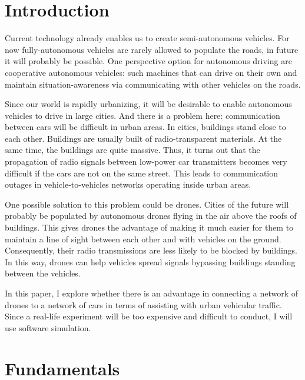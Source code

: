 \documentclass[]{nsm-thesis}
\begin{document}
\chapter{Introduction}
\label{sec:introduction}

Current technology already enables us to create semi-autonomous vehicles. For now fully-autonomous vehicles are rarely allowed to 
populate the roads, in future it will probably be possible. One perspective option for autonomous driving are cooperative autonomous vehicles: such machines
that can drive on their own and maintain situation-awareness via communicating with other vehicles on the roads.

Since our world is rapidly urbanizing, it will be desirable to enable autonomous vehicles to drive in large cities. And there is a problem here: communication between cars will be difficult in urban areas. In cities, buildings stand close to each other. Buildings are usually built of radio-transparent materials. At the same time, the buildings are quite massive. Thus, it turns out that the propagation of radio signals between low-power car transmitters becomes very difficult if the cars are not on the same street. This leads to communication outages in vehicle-to-vehicles networks operating inside urban areas.

One possible solution to this problem could be drones. Cities of the future will probably be populated by autonomous drones flying in the air above the roofs of buildings. This gives drones the advantage of making it much easier for them to maintain a line of sight between each other and with vehicles on the ground. Consequently, their radio transmissions are less likely to be blocked by buildings. In this way, drones can help vehicles spread signals bypassing buildings standing between the vehicles.

In this paper, I explore whether there is an advantage in connecting a network of drones to a network of cars in terms of assisting with urban vehicular traffic.
Since a real-life experiment will be too expensive and difficult to conduct, I will use software simulation.

\chapter{Fundamentals}
\label{sec:fundamentals}
\end{document}
